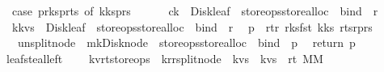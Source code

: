 \begin{isabellebody}
\ \ case\ {\isacharparenleft}p{\isacharbar}{\isachargreater}r{\isacharunderscore}ks{}{\isacharcomma}p{\isacharbar}{\isachargreater}r{\isacharunderscore}ts{}{\isacharparenright}\ of\ {\isacharparenleft}k{}{\isacharhash}ks{}{\isacharcomma}{\isacharunderscore}{\isacharhash}p{\isacharunderscore}rs{}{\isacharparenright}\ {\isasymRightarrow}\ \ \ \isanewline
\ \ {\isacharparenleft}c{}{\isacharat}{\isacharbrackleft}k{}{\isacharbrackright}{\isacharparenright}\ {\isacharbar}{\isachargreater}\ Disk{\isacharunderscore}leaf\ {\isacharbar}{\isachargreater}\ {\isacharparenleft}store{\isacharunderscore}ops{\isacharbar}{\isachargreater}store{\isacharunderscore}alloc{\isacharparenright}\ {\isacharbar}{\isachargreater}\ bind\ {\isacharparenleft}{\isacharpercent}\ r{}{\isachardot}\isanewline
\ \ {\isacharparenleft}k{}{\isacharhash}kvs{}{\isacharparenright}\ {\isacharbar}{\isachargreater}\ Disk{\isacharunderscore}leaf\ {\isacharbar}{\isachargreater}\ {\isacharparenleft}store{\isacharunderscore}ops{\isacharbar}{\isachargreater}store{\isacharunderscore}alloc{\isacharparenright}\ {\isacharbar}{\isachargreater}\ bind\ {\isacharparenleft}{\isacharpercent}\ r{}{\isachardot}\isanewline
\ \ p\ {\isasymlparr}\ r{\isacharunderscore}t{\isacharcolon}{\isacharequal}r{}{\isacharcomma}\ r{\isacharunderscore}ks{}{\isacharcolon}{\isacharequal}{\isacharparenleft}fst\ k{}{\isacharparenright}{\isacharhash}ks{}{\isacharcomma}\ r{\isacharunderscore}ts{}{\isacharcolon}{\isacharequal}r{}{\isacharhash}p{\isacharunderscore}rs{}\ {\isasymrparr}\isanewline
\ \ {\isacharbar}{\isachargreater}\ unsplit{\isacharunderscore}node\ {\isacharbar}{\isachargreater}\ mk{\isacharunderscore}Disk{\isacharunderscore}node\ {\isacharbar}{\isachargreater}\ {\isacharparenleft}store{\isacharunderscore}ops{\isacharbar}{\isachargreater}store{\isacharunderscore}alloc{\isacharparenright}\ {\isacharbar}{\isachargreater}\ bind\ {\isacharparenleft}{\isacharpercent}\ p{\isachardot}\isanewline
\ \ return\ p{\isacharparenright}{\isacharparenright}{\isacharparenright}{\isacharparenright}{\isachardoublequoteclose}\isanewline
\isanewline
\isanewline
{}\isamarkupfalse%
\ leaf{\isacharunderscore}steal{\isacharunderscore}left\ {\isacharcolon}{\isacharcolon}\ \isanewline
\ \ {\isachardoublequoteopen}{\isacharparenleft}{\isacharprime}k{\isacharcomma}{\isacharprime}v{\isacharcomma}{\isacharprime}r{\isacharcomma}{\isacharprime}t{\isacharparenright}store{\isacharunderscore}ops\ {\isasymRightarrow}\ {\isacharparenleft}{\isacharprime}k{\isacharcomma}{\isacharprime}r{\isacharparenright}rsplit{\isacharunderscore}node\ {\isasymRightarrow}\ {\isacharparenleft}{\isacharprime}k{\isacharasterisk}{\isacharprime}v{\isacharparenright}s\ {\isasymRightarrow}\ {\isacharparenleft}{\isacharprime}k{\isacharasterisk}{\isacharprime}v{\isacharparenright}s\ {\isasymRightarrow}\ {\isacharparenleft}{\isacharprime}r{\isacharcomma}{\isacharprime}t{\isacharparenright}\ MM{\isachardoublequoteclose}\ \ \isanewline

\end{isabellebody}
